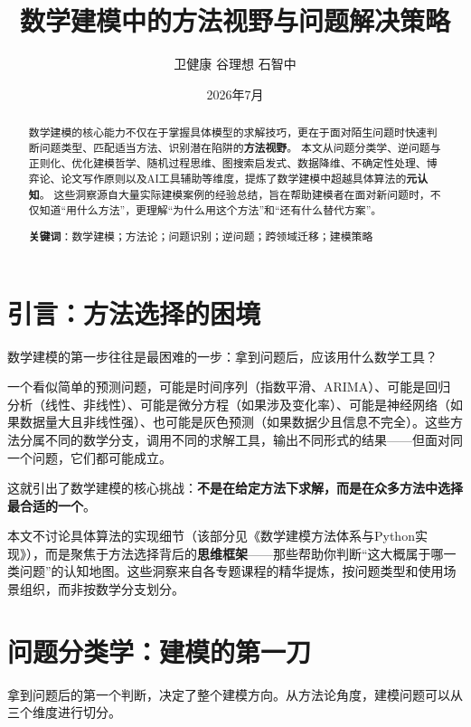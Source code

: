\documentclass[12pt,a4paper]{ctexart}
\title{\vspace{-2cm}\textbf{数学建模中的方法视野与问题解决策略}\\[4pt]}
\author{卫健康 \quad 谷理想 \quad 石智中}
\date{2026年7月}
\begin{document}
\maketitle

\begin{abstract}
\noindent 数学建模的核心能力不仅在于掌握具体模型的求解技巧，更在于面对陌生问题时快速判断问题类型、匹配适当方法、识别潜在陷阱的\textbf{方法视野}。
本文从问题分类学、逆问题与正则化、优化建模哲学、随机过程思维、图搜索启发式、数据降维、不确定性处理、博弈论、论文写作原则以及AI工具辅助等维度，提炼了数学建模中超越具体算法的\textbf{元认知}。
这些洞察源自大量实际建模案例的经验总结，旨在帮助建模者在面对新问题时，不仅知道``用什么方法''，更理解``为什么用这个方法''和``还有什么替代方案''。

\textbf{关键词}：数学建模；方法论；问题识别；逆问题；跨领域迁移；建模策略
\end{abstract}

\section{引言：方法选择的困境}

数学建模的第一步往往是最困难的一步：拿到问题后，应该用什么数学工具？

一个看似简单的预测问题，可能是时间序列（指数平滑、ARIMA）、可能是回归分析（线性、非线性）、可能是微分方程（如果涉及变化率）、可能是神经网络（如果数据量大且非线性强）、也可能是灰色预测（如果数据少且信息不完全）。这些方法分属不同的数学分支，调用不同的求解工具，输出不同形式的结果——但面对同一个问题，它们都可能成立。

这就引出了数学建模的核心挑战：\textbf{不是在给定方法下求解，而是在众多方法中选择最合适的一个}。

本文不讨论具体算法的实现细节（该部分见《数学建模方法体系与Python实现》），而是聚焦于方法选择背后的\textbf{思维框架}——那些帮助你判断``这大概属于哪一类问题''的认知地图。这些洞察来自各专题课程的精华提炼，按问题类型和使用场景组织，而非按数学分支划分。

\section{问题分类学：建模的第一刀}

拿到问题后的第一个判断，决定了整个建模方向。从方法论角度，建模问题可以从三个维度进行切分。
\end{document}
